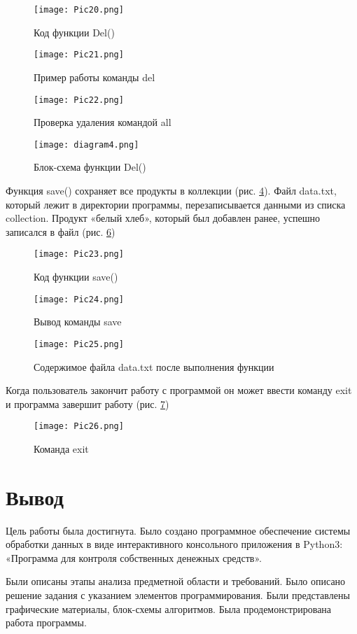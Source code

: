 \documentclass[14pt]{extreport}
\begin{document}
\begin{figure}[H]
\centerline{\texttt{[image: Pic20.png]}}
\caption{Код функции Del()}
\label{fig30}
\end{figure}

\begin{figure}[H]
\centerline{\texttt{[image: Pic21.png]}}
\caption{Пример работы команды del}
\label{fig31}
\end{figure}

\begin{figure}[H]
\centerline{\texttt{[image: Pic22.png]}}
\caption{Проверка удаления командой all}
\label{fig32}
\end{figure}

\begin{figure}[H]
\centerline{\texttt{[image: diagram4.png]}}
\caption{Блок-схема функции Del()}
\end{figure}

Функция save() сохраняет все продукты в коллекции (рис. \ref{fig33}). Файл data.txt, который лежит в директории программы, перезаписывается данными из списка collection. Продукт «белый хлеб», который был добавлен ранее, успешно записался в файл (рис. \ref{fig35})

\begin{figure}[H]
\centerline{\texttt{[image: Pic23.png]}}
\caption{Код функции save()}
\label{fig33}
\end{figure}

\begin{figure}[H]
\centerline{\texttt{[image: Pic24.png]}}
\caption{Вывод команды save}
\label{fig34}
\end{figure}

\begin{figure}[H]
\centerline{\texttt{[image: Pic25.png]}}
\caption{Содержимое файла data.txt после выполнения функции}
\label{fig35}
\end{figure}

Когда пользователь закончит работу с программой он может ввести команду exit и программа завершит работу (рис. \ref{fig36})

\begin{figure}[H]
\centerline{\texttt{[image: Pic26.png]}}
\caption{Команда exit}
\label{fig36}
\end{figure}

\chapter{Вывод}

Цель работы была достигнута. Было создано программное обеспечение системы обработки данных в виде интерактивного консольного приложения в Python3: «Программа для контроля собственных денежных средств».

Были описаны этапы анализа предметной области и требований. Было описано решение задания с указанием элементов программирования. Были представлены графические материалы, блок-схемы алгоритмов. Была продемонстрирована работа программы.
\end{document}
